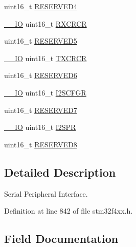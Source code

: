\begin{DoxyCompactItemize}
\item 
uint16\+\_\+t \hyperlink{struct_s_p_i___type_def_aa0223808025f5bf9c056185038c9d545}{R\+E\+S\+E\+R\+V\+E\+D4}
\item 
\hyperlink{group___c_m_s_i_s__core__definitions_gaec43007d9998a0a0e01faede4133d6be}{\+\_\+\+\_\+\+IO} uint16\+\_\+t \hyperlink{struct_s_p_i___type_def_a7ad53aa3735ccdd785e3eec02faf5eb9}{R\+X\+C\+R\+CR}
\item 
uint16\+\_\+t \hyperlink{struct_s_p_i___type_def_abd36010ac282682d1f3c641b183b1b6f}{R\+E\+S\+E\+R\+V\+E\+D5}
\item 
\hyperlink{group___c_m_s_i_s__core__definitions_gaec43007d9998a0a0e01faede4133d6be}{\+\_\+\+\_\+\+IO} uint16\+\_\+t \hyperlink{struct_s_p_i___type_def_a0238d40f977d03709c97033b8379f98f}{T\+X\+C\+R\+CR}
\item 
uint16\+\_\+t \hyperlink{struct_s_p_i___type_def_aab502dde158ab7da8e7823d1f8a06edb}{R\+E\+S\+E\+R\+V\+E\+D6}
\item 
\hyperlink{group___c_m_s_i_s__core__definitions_gaec43007d9998a0a0e01faede4133d6be}{\+\_\+\+\_\+\+IO} uint16\+\_\+t \hyperlink{struct_s_p_i___type_def_acb40abca5ca4cd2b2855adf2186effe8}{I2\+S\+C\+F\+GR}
\item 
uint16\+\_\+t \hyperlink{struct_s_p_i___type_def_ab1820c97e368d349f5f4121f015d9fab}{R\+E\+S\+E\+R\+V\+E\+D7}
\item 
\hyperlink{group___c_m_s_i_s__core__definitions_gaec43007d9998a0a0e01faede4133d6be}{\+\_\+\+\_\+\+IO} uint16\+\_\+t \hyperlink{struct_s_p_i___type_def_a02ce1ece243cc4ce1d66ebeca247fee1}{I2\+S\+PR}
\item 
uint16\+\_\+t \hyperlink{struct_s_p_i___type_def_afc22764fbf9ee7ce28174d65d0260f18}{R\+E\+S\+E\+R\+V\+E\+D8}
\end{DoxyCompactItemize}


\subsection{Detailed Description}
Serial Peripheral Interface. 

Definition at line 842 of file stm32f4xx.\+h.



\subsection{Field Documentation}
\mbox{\label{struct_s_p_i___type_def_a61400ce239355b62aa25c95fcc18a5e1}} 

